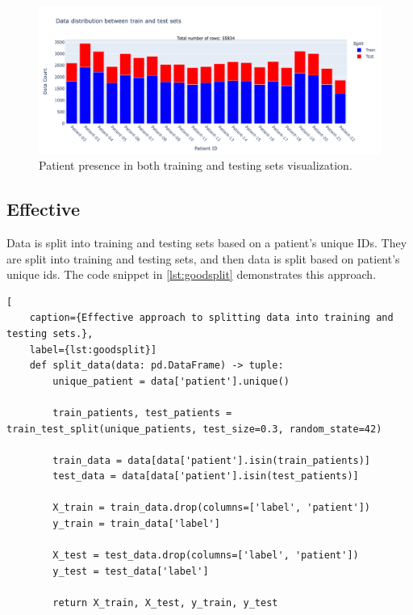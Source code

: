                    \begin{figure}[H]
                        \centering
                        \includegraphics[width=1.0\textwidth]{../src/resources/plots/splits/bad.png}
                        \caption{
                            Patient presence in both training and testing sets visualization.
                        }
                        \label{fig:badsplit}
                    \end{figure}
        
                    \newpage

            \subsection{Effective} \label{sec:goodsplit}
            Data is split into training and testing sets based on a patient's unique IDs. They are split into training and testing sets, and then data is split based on patient's unique ids. The code snippet in \ref{lst:goodsplit} demonstrates this approach.

\begin{lstlisting}[
    caption={Effective approach to splitting data into training and testing sets.}, 
    label={lst:goodsplit}]
    def split_data(data: pd.DataFrame) -> tuple:    
        unique_patient = data['patient'].unique()

        train_patients, test_patients = train_test_split(unique_patients, test_size=0.3, random_state=42)

        train_data = data[data['patient'].isin(train_patients)]
        test_data = data[data['patient'].isin(test_patients)] 

        X_train = train_data.drop(columns=['label', 'patient'])
        y_train = train_data['label']

        X_test = test_data.drop(columns=['label', 'patient'])
        y_test = test_data['label']
        
        return X_train, X_test, y_train, y_test
\end{lstlisting}

